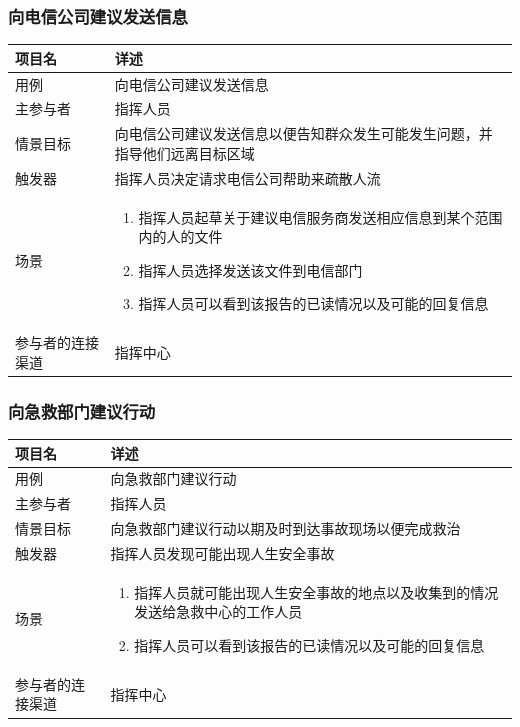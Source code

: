 \documentclass{ctexrep}
\begin{document}
\subsubsection{向电信公司建议发送信息}
\begin{longtable}{p{2cm} | p{10cm}}
\hline
项目名 & 详述 \\
\hline
\hline
用例 & 向电信公司建议发送信息\\
\hline
主参与者 &  指挥人员\\
\hline
情景目标 &向电信公司建议发送信息以便告知群众发生可能发生问题，并指导他们远离目标区域  \\
\hline
触发器 & 指挥人员决定请求电信公司帮助来疏散人流 \\
\hline
场景 & \begin{enumerate}
	\item 指挥人员起草关于建议电信服务商发送相应信息到某个范围内的人的文件
	\item 指挥人员选择发送该文件到电信部门
	\item 指挥人员可以看到该报告的已读情况以及可能的回复信息
\end{enumerate} \\
\hline
参与者的连接渠道 & 指挥中心 \\
\hline
\end{longtable}

\subsubsection{向急救部门建议行动}
\begin{longtable}{p{2cm} | p{10cm}}
\hline
项目名 & 详述 \\
\hline
\hline
用例 & 向急救部门建议行动\\
\hline
主参与者 & 指挥人员 \\
\hline
情景目标 & 向急救部门建议行动以期及时到达事故现场以便完成救治 \\
\hline
触发器 & 指挥人员发现可能出现人生安全事故 \\
\hline
场景 & \begin{enumerate}
	\item 指挥人员就可能出现人生安全事故的地点以及收集到的情况发送给急救中心的工作人员
	\item 指挥人员可以看到该报告的已读情况以及可能的回复信息
\end{enumerate} \\
\hline
参与者的连接渠道 & 指挥中心 \\
\hline
\end{longtable}
\end{document}
